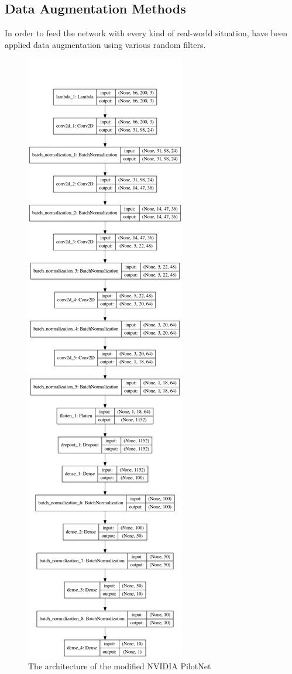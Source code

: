 \documentclass[10pt,twocolumn,letterpaper]{article}
\begin{document}
\subsection{Data Augmentation Methods}
In order to feed the network with every kind of real-world situation, have been applied data augmentation using various random filters.

\begin{figure}[h!]
    \centering
    \includegraphics[scale=0.10]{images/model.png}
    \caption{The architecture of the modified NVIDIA PilotNet}
    \label{fig:modell}
\end{figure}
\end{document}
